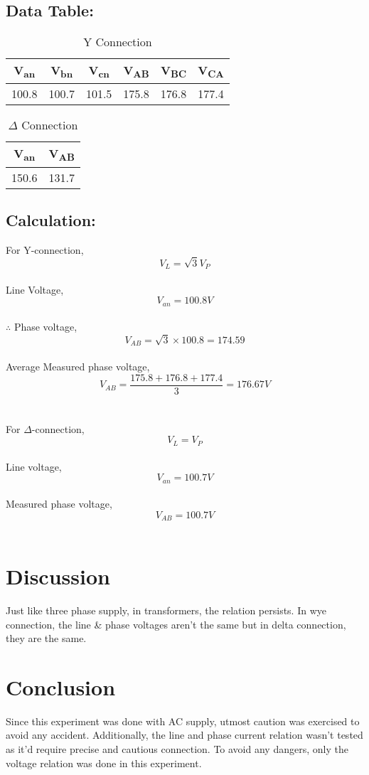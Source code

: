 \documentclass[12pt]{article}
\begin{document}
\subsection{Data Table:}
\begin{table}[H]
    \centering
    \caption{Y Connection}
    \begin{tabular}{|c|c|c|c|c|c|}
        \hline
        \bf{V\textsubscript{an}} & \bf{V\textsubscript{bn}} & \bf{V\textsubscript{cn}} & \bf{V\textsubscript{AB}} & \bf{V\textsubscript{BC}} & \bf{V\textsubscript{CA}} \\
        \hline
        100.8                    & 100.7                    & 101.5                    & 175.8                    & 176.8                    & 177.4                    \\
        \hline
    \end{tabular}
\end{table}
\begin{table}[H]
    \centering
    \caption{$\Delta$ Connection}
    \begin{tabular}{|c|c|}
        \hline
        \bf{V\textsubscript{an}} & \bf{V\textsubscript{AB}} \\
        \hline
        150.6                    & 131.7                    \\
        \hline
    \end{tabular}
\end{table}

\subsection{Calculation:}
For Y-connection, \[V_L = \sqrt{3}V_P\] \\
Line Voltage, \[V_{an} = 100.8V\] \\
$\therefore$ Phase voltage, \[V_{AB} = \sqrt{3}\times 100.8 = 174.59\] \\
Average Measured phase voltage, \[V_{AB} = \frac{175.8+176.8+177.4}{3} = 176.67V\] \\\\
For $\Delta$-connection, \[V_L = V_P\] \\
Line voltage, \[V_{an} = 100.7V\] \\
Measured phase voltage, \[V_{AB} = 100.7V\] \\

\section{Discussion}
Just like three phase supply, in transformers, the relation persists. In wye connection, the line \& phase voltages aren't the same but in delta connection, they are the same.


\section{Conclusion}
Since this experiment was done with AC supply, utmost caution was exercised to avoid any accident. Additionally, the line and phase current relation wasn't tested as it'd require precise and cautious connection. To avoid any dangers, only the voltage relation was done in this experiment.


\end{document}
